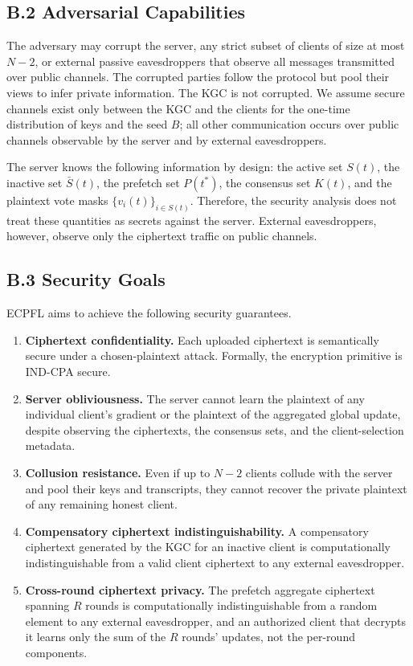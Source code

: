 \documentclass[10pt]{article}
\begin{document}
\subsection*{B.2 Adversarial Capabilities}

The adversary may corrupt the server, any strict subset of clients of size at most $N-2$, or external passive eavesdroppers that observe all messages transmitted over public channels. The corrupted parties follow the protocol but pool their views to infer private information. The KGC is not corrupted. We assume secure channels exist only between the KGC and the clients for the one-time distribution of keys and the seed $B$; all other communication occurs over public channels observable by the server and by external eavesdroppers.

The server knows the following information by design: the active set $S(t)$, the inactive set $\bar{S}(t)$, the prefetch set $P(t^*)$, the consensus set $K(t)$, and the plaintext vote masks $\{v_i(t)\}_{i\in S(t)}$. Therefore, the security analysis does not treat these quantities as secrets against the server. External eavesdroppers, however, observe only the ciphertext traffic on public channels.

\subsection*{B.3 Security Goals}

ECPFL aims to achieve the following security guarantees.

\begin{enumerate}
    \item \textbf{Ciphertext confidentiality.} Each uploaded ciphertext is semantically secure under a chosen-plaintext attack. Formally, the encryption primitive is IND-CPA secure.

    \item \textbf{Server obliviousness.} The server cannot learn the plaintext of any individual client's gradient or the plaintext of the aggregated global update, despite observing the ciphertexts, the consensus sets, and the client-selection metadata.

    \item \textbf{Collusion resistance.} Even if up to $N-2$ clients collude with the server and pool their keys and transcripts, they cannot recover the private plaintext of any remaining honest client.

    \item \textbf{Compensatory ciphertext indistinguishability.} A compensatory ciphertext generated by the KGC for an inactive client is computationally indistinguishable from a valid client ciphertext to any external eavesdropper.

    \item \textbf{Cross-round ciphertext privacy.} The prefetch aggregate ciphertext spanning $R$ rounds is computationally indistinguishable from a random element to any external eavesdropper, and an authorized client that decrypts it learns only the sum of the $R$ rounds' updates, not the per-round components.
\end{enumerate}
\end{document}
